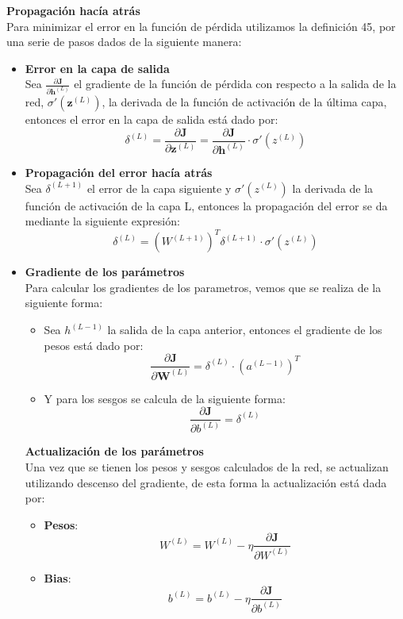 \noindent \textbf{Propagación hacía atrás}\\
Para minimizar el error en la función de pérdida utilizamos la definición 45, por una serie de pasos dados de la siguiente manera:
\begin{itemize}
    \item \textbf{Error en la capa de salida}\\
          Sea $\frac{\partial \mathbf{J}}{\partial \mathbf{h}^{(L)}} $ el gradiente de la función de pérdida con respecto a la salida de la red, $\sigma ' (\mathbf{z}^{(L)})$, la derivada de la función de activación de la última capa, entonces el error en la capa de salida está dado por:
          \[
              \delta^{(L)} = \frac{\partial \mathbf{J}}{\partial \mathbf{z}^{(L)}} = \frac{\partial \mathbf{J}}{\partial \mathbf{h}^{(L)}} \cdot \sigma ' (z^{(L)})
          \]
    \item \textbf{Propagación del error hacía atrás}\\
          Sea $\delta ^{(L+1)}$ el error de la capa siguiente y $\sigma ' (z^{(L)})$ la derivada de la función de activación de la capa L, entonces la propagación del error se da mediante la siguiente expresión:
          \[
              \delta^{(L)} = \left( W^{(L+1)}\right)^T \delta ^{(L+1)} \cdot \sigma ' (z^{(L)})
          \]
    \item \textbf{Gradiente de los parámetros}\\
          Para calcular los gradientes de los parametros, vemos que se realiza de la siguiente forma:
          \begin{itemize}
              \item Sea $h^{(L-1)}$ la salida de la capa anterior, entonces el gradiente de los pesos está dado por:
                    \[
                        \frac{\partial \mathbf{J}}{\partial \mathbf{    W}^{(L)}} = \delta ^{(L)} \cdot \left(a^{(L-1)}\right)^T
                    \]
              \item Y para los sesgos se calcula de la siguiente forma:
                    \[
                        \frac{\partial\mathbf{J}}{\partial b^{(L)}} = \delta^{(L)}
                    \]
          \end{itemize}

          \noindent \textbf{Actualización de los parámetros}\\
          Una vez que se tienen los pesos y sesgos calculados de la red, se actualizan utilizando descenso del gradiente, de esta forma la actualización está dada por:
          \begin{itemize}
              \item \textbf{Pesos}:
                    \[
                        W^{(L)} = W^{(L)}- \eta \frac{\partial \mathbf{J}}{\partial W^{(L)}}
                    \]

              \item \textbf{Bias}:
                    \[
                        b^{(L)} = b^{(L)}- \eta \frac{\partial\mathbf{J}}{\partial b^{(L)}}
                    \]

          \end{itemize}

\end{itemize}
